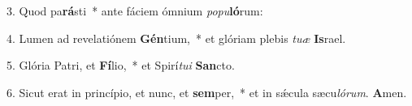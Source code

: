 \item 3. Quod pa\textbf{rá}sti~* ante fáciem ómnium \textit{popu}\textbf{ló}rum:
\item 4. Lumen ad revelatiónem \textbf{Gén}tium,~* et glóriam plebis \textit{tuæ} \textbf{Is}rael.
\item 5. Glória Patri, et \textbf{Fí}lio,~* et Spirí\textit{tui} \textbf{San}cto.
\item 6. Sicut erat in princípio, et nunc, et \textbf{sem}per,~* et in sǽcula sæcu\hspace{0.03em}\textit{lórum}. \textbf{A}men.
